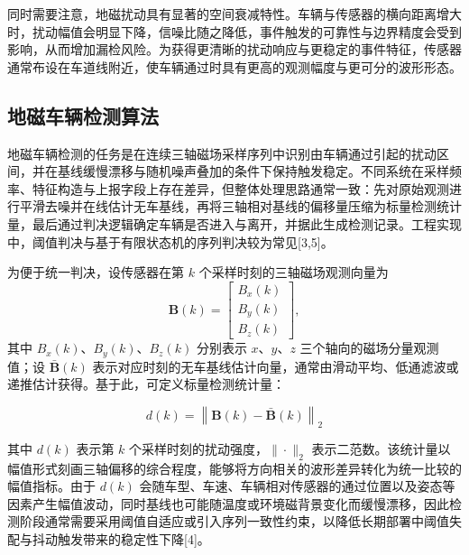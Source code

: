 \documentclass{xdupgthesis}
\begin{document}

同时需要注意，地磁扰动具有显著的空间衰减特性。车辆与传感器的横向距离增大时，扰动幅值会明显下降，信噪比随之降低，事件触发的可靠性与边界精度会受到影响，从而增加漏检风险。为获得更清晰的扰动响应与更稳定的事件特征，传感器通常布设在车道线附近，使车辆通过时具有更高的观测幅度与更可分的波形形态。



\subsection{地磁车辆检测算法}\label{sec:vehicle_detection}

地磁车辆检测的任务是在连续三轴磁场采样序列中识别由车辆通过引起的扰动区间，并在基线缓慢漂移与随机噪声叠加的条件下保持触发稳定。不同系统在采样频率、特征构造与上报字段上存在差异，但整体处理思路通常一致：先对原始观测进行平滑去噪并在线估计无车基线，再将三轴相对基线的偏移量压缩为标量检测统计量，最后通过判决逻辑确定车辆是否进入与离开，并据此生成检测记录。工程实现中，阈值判决与基于有限状态机的序列判决较为常见[3,5]。

为便于统一判决，设传感器在第 $k$ 个采样时刻的三轴磁场观测向量为
\[
\mathbf{B}(k) =
\begin{bmatrix}
	B_x(k) \\
	B_y(k) \\
	B_z(k)
\end{bmatrix},
\]
其中 $B_x(k)$、$B_y(k)$、$B_z(k)$ 分别表示 $x$、$y$、$z$ 三个轴向的磁场分量观测值；设 $\bar{\mathbf{B}}(k)$ 表示对应时刻的无车基线估计向量，通常由滑动平均、低通滤波或递推估计获得。基于此，可定义标量检测统计量：

\begin{equation}
	d(k)=\left\|\mathbf{B}(k)-\bar{\mathbf{B}}(k)\right\|_{2}
	\tag{2-1}
\end{equation}

其中 $d(k)$ 表示第 $k$ 个采样时刻的扰动强度，$\|\cdot\|_2$ 表示二范数。该统计量以幅值形式刻画三轴偏移的综合程度，能够将方向相关的波形差异转化为统一比较的幅值指标。由于 $d(k)$ 会随车型、车速、车辆相对传感器的通过位置以及姿态等因素产生幅值波动，同时基线也可能随温度或环境磁背景变化而缓慢漂移，因此检测阶段通常需要采用阈值自适应或引入序列一致性约束，以降低长期部署中阈值失配与抖动触发带来的稳定性下降[4]。
\end{document}
